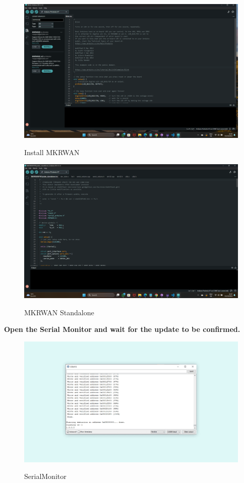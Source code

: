 	\begin{figure}
		\begin{center}
			\includegraphics[width=0.7\linewidth]{Images/LORA/InstallMKRWAN.png}
			\caption{Install MKRWAN}
			\label{Install MKRWAN}\cite{connecting_to_ttn_portenta_vision_shield:2024}
		\end{center}
	\end{figure}
	
	\begin{figure}
		\begin{center}
			\includegraphics[width=0.7\linewidth]{Images/LORA/MKRWANStandalone.png}
			\caption{MKRWAN Standalone}
			\label{MKRWAN Standalone}\cite{connecting_to_ttn_portenta_vision_shield:2024}
		\end{center}
	\end{figure}

	\textbf{Open the Serial Monitor and wait for the update to be confirmed.}
	
	\begin{figure}
		\begin{center}
			\includegraphics[width=0.7\linewidth]{Images/LORA/SerialMonitor.png}
			\caption{SerialMonitor}
			\label{SerialMonitor}\cite{connecting_to_ttn_portenta_vision_shield:2024}
		\end{center}
	\end{figure}
	
